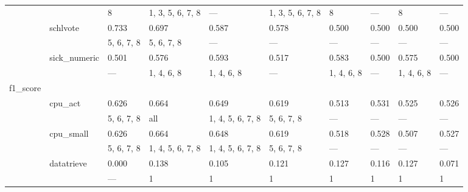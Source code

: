\documentclass{article}
\begin{document}
\begin{center}
\begin{longtable}{p{1.2cm}p{1.8cm}p{1cm}p{1cm}p{1cm}p{1cm}p{1cm}p{1cm}p{1cm}p{1cm}}
             &              & 8             & 1, 3, 5, 6, 7, 8 & ---              & 1, 3, 5, 6, 7, 8 & 8                & ---              & 8                & ---              \\
             & schlvote     & 0.733         & 0.697            & 0.587            & 0.578            & 0.500            & 0.500            & 0.500            & 0.500            \\
             &              & 5, 6, 7, 8    & 5, 6, 7, 8       & ---              & ---              & ---              & ---              & ---              & ---              \\
             & sick\_numeric & 0.501         & 0.576            & 0.593            & 0.517            & 0.583            & 0.500            & 0.575            & 0.500            \\
             &              & ---           & 1, 4, 6, 8       & 1, 4, 6, 8       & ---              & 1, 4, 6, 8       & ---              & 1, 4, 6, 8       & ---              \\
 f1\_score    &              &               &                  &                  &                  &                  &                  &                  &                  \\
             & cpu\_act      & 0.626         & 0.664            & 0.649            & 0.619            & 0.513            & 0.531            & 0.525            & 0.526            \\
             &              & 5, 6, 7, 8    & all              & 1, 4, 5, 6, 7, 8 & 5, 6, 7, 8       & ---              & ---              & ---              & ---              \\
             & cpu\_small    & 0.626         & 0.664            & 0.648            & 0.619            & 0.518            & 0.528            & 0.507            & 0.527            \\
             &              & 5, 6, 7, 8    & 1, 4, 5, 6, 7, 8 & 1, 4, 5, 6, 7, 8 & 5, 6, 7, 8       & ---              & ---              & ---              & ---              \\
             & datatrieve   & 0.000         & 0.138            & 0.105            & 0.121            & 0.127            & 0.116            & 0.127            & 0.071            \\
             &              & ---           & 1                & 1                & 1                & 1                & 1                & 1                & 1                \\

\end{longtable}
\end{center}
\end{document}
